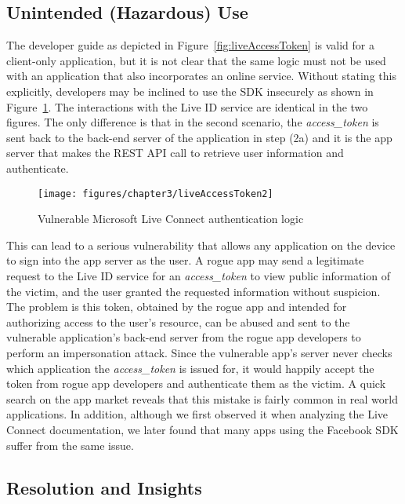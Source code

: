 \subsection{Unintended (Hazardous) Use}

The developer guide as depicted in Figure~\ref{fig:liveAccessToken} is valid for a client-only application, but it is not clear that the same logic must not be used with an application that also incorporates an online service.  Without stating this explicitly, developers may be inclined to use the SDK insecurely as shown in Figure~\ref{fig:liveAccessToken2}. The interactions with the Live ID service are identical in the two figures.  The only difference is that in the second scenario, the \emph{access\_token} is sent back to the back-end server of the application in step (2a) and it is the app server that makes the REST API call to retrieve user information and authenticate. 

\begin{figure}[hbt]
\centering
\texttt{[image: figures/chapter3/liveAccessToken2]}
\caption{Vulnerable Microsoft Live Connect authentication logic}
\label{fig:liveAccessToken2}
\end{figure}

This can lead to a serious vulnerability that allows any application on the device to sign into the app server as the user. A rogue app may send a legitimate request to the Live ID service for an \emph{access\_token} to view public information of the victim, and the user granted the requested information without suspicion.  The problem is this token, obtained by the rogue app and intended for authorizing access to the user's resource, can be abused and sent to the vulnerable application's back-end server from the rogue app developers to perform an impersonation attack.  Since the vulnerable app's server never checks which application the \emph{access\_token} is issued for, it would happily accept the token from rogue app developers and authenticate them as the victim.  A quick search on the app market reveals that this mistake is fairly common in real world applications.  In addition, although we first observed it when analyzing the Live Connect documentation, we later found that many apps using the Facebook SDK suffer from the same issue.  

\subsection{Resolution and Insights}

